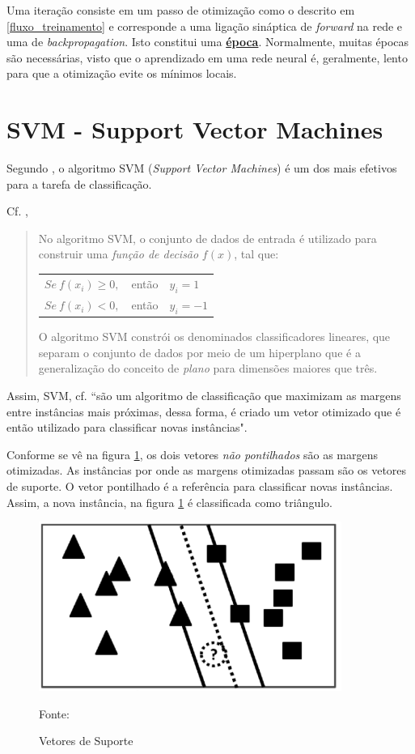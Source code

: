 Uma iteração consiste em um passo de otimização como o descrito em \ref{fluxo_treinamento} e corresponde a uma ligação sináptica de \textit{forward} na rede e uma de \textit{backpropagation}. Isto constitui uma \textbf{\underline{época}}. Normalmente, muitas épocas são necessárias, visto que o aprendizado em uma rede neural é, geralmente, lento para que a otimização evite os mínimos locais.

\section{SVM - Support Vector Machines}\label{SVM}
Segundo \cite{cortes_svm_1995}, o algoritmo SVM (\textit{Support Vector Machines}) é um dos mais efetivos para a tarefa de classificação.

Cf. \cite{goldschmidt2005},
\begin{quotation}
	No algoritmo SVM, o conjunto de dados de entrada é utilizado para construir uma \textit{função de decisão} $f(x)$, tal que:
	
	\begin{table}[h!]
		\centering
		\begin{tabular}{lll}			
			$ Se \ f(x_i) \geq 0,  $ & então   & $ y_i = 1 $  \\
			$ Se \ f(x_i) < 0, $ & então & $ y_i = -1 $  
		\end{tabular}
	\end{table}
	
	O algoritmo SVM constrói os denominados classificadores lineares, que separam o conjunto de dados por meio de um hiperplano que é a generalização do conceito de \textit{plano} para dimensões maiores que três.	
\end{quotation}

Assim, SVM, cf. \cite[p. 45]{aprenda_mineracao_fernando_amaral16} ``são um algoritmo de classificação que maximizam as margens entre instâncias mais próximas, dessa forma, é criado um vetor otimizado que é então utilizado para classificar novas instâncias".

Conforme se vê na figura \ref{fig:svm}, os dois vetores \textit{não pontilhados} são as margens otimizadas. As instâncias por onde as margens otimizadas passam são os vetores de suporte. O vetor pontilhado é a referência para classificar novas instâncias. Assim, a nova instância, na figura \ref{fig:svm} é classificada como triângulo.

\begin{figure}[h!]
	\centering
	\includegraphics[width=.7\textwidth]{imagens/vetores_de_suporte.png}	
	\caption{Vetores de Suporte}
	\label{fig:svm}
	{\scriptsize 	Fonte: \cite[p. 45]{aprenda_mineracao_fernando_amaral16}}
\end{figure}

